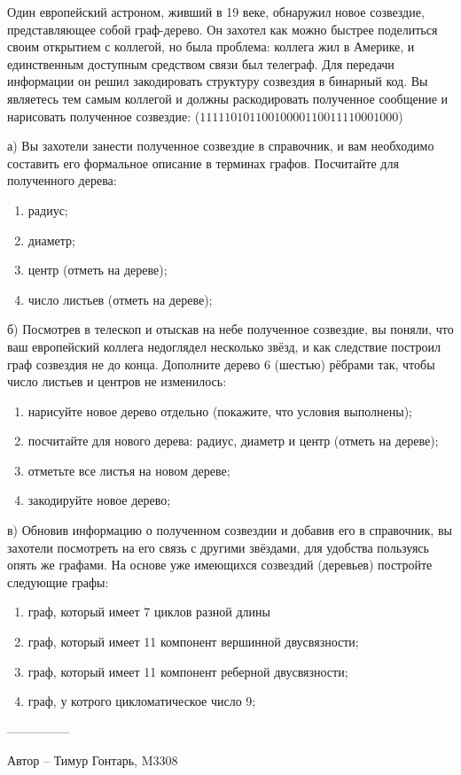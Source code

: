 \question
Один европейский астроном, живший в 19 веке, обнаружил новое созвездие, представляющее собой граф-дерево. Он захотел как можно быстрее поделиться своим открытием с коллегой, но была проблема: коллега жил в Америке, и единственным доступным средством связи был телеграф. Для передачи информации он решил закодировать структуру созвездия в бинарный код. Вы являетесь тем самым коллегой и должны раскодировать полученное сообщение и нарисовать полученное созвездие: ($11111010110010000110011110001000$)

а) Вы захотели занести полученное созвездие в справочник, и вам необходимо составить его формальное описание в терминах графов. Посчитайте для полученного дерева:
\begin{enumerate}
\item радиус;
\item диаметр;
\item центр (отметь на дереве);
\item число листьев (отметь на дереве);
\end{enumerate}

б) Посмотрев в телескоп и отыскав на небе полученное созвездие, вы поняли, что ваш европейский коллега недоглядел несколько звёзд, и как следствие построил граф созвездия не до конца. Дополните дерево 6 (шестью) рёбрами так, чтобы число листьев и центров не изменилось:
\begin{enumerate}
\item нарисуйте новое дерево отдельно (покажите, что условия выполнены);
\item посчитайте для нового дерева: радиус, диаметр и центр (отметь на дереве);
\item отметьте все листья на новом дереве;
\item закодируйте новое дерево;
\end{enumerate}

в) Обновив информацию о полученном созвездии и добавив его в справочник, вы захотели посмотреть на его связь с другими звёздами, для удобства пользуясь опять же графами. На основе уже имеющихся созвездий (деревьев) постройте следующие графы:
\begin{enumerate}
\item граф, который имеет 7 циклов разной длины
\item граф, который имеет 11 компонент вершинной двусвязности;
\item граф, который имеет 11 компонент реберной двусвязности;
\item граф, у котрого цикломатическое число 9;
\end{enumerate}

---------------

Автор -- Тимур Гонтарь, M3308
